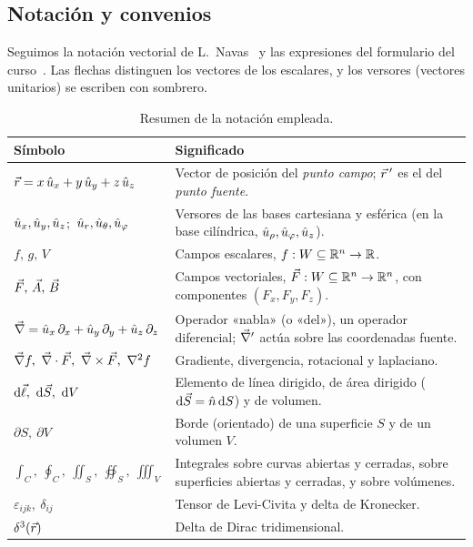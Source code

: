 \subsection{Notación y convenios}\label{sec:notacion}
Seguimos la notación vectorial de L.~Navas~\cite{NAVAS} y las expresiones del
formulario del curso~\cite{FORMULARIO}. Las flechas distinguen los
vectores de los escalares, y los versores (vectores unitarios) se escriben con
sombrero.

\begin{table}[ht]
\centering
\caption{Resumen de la notación empleada.}
\label{tab:notacion}
\small
\renewcommand{\arraystretch}{1.35}
\begin{tabular}{@{}p{4.6cm}p{9.2cm}@{}}
\toprule
Símbolo & Significado\\
\midrule
$\vec{r}=x\,\hat{u}_{x}+y\,\hat{u}_{y}+z\,\hat{u}_{z}$ & Vector de posición del \emph{punto campo};
  $\vec{r}\,'$ es el del \emph{punto fuente}.\\
$\hat{u}_{x},\hat{u}_{y},\hat{u}_{z}$;\ $\hat{u}_{r},\hat{u}_{\theta},\hat{u}_{\varphi}$ & Versores de las bases cartesiana y esférica
  (en la base cilíndrica, $\hat{u}_{\rho},\hat{u}_{\varphi},\hat{u}_{z}$).\\
$f,\,g,\,V$ & Campos escalares, $f:W\subseteq\mathbb{R}^{n}\to\mathbb{R}$.\\
$\vec{F},\,\vec{A},\,\vec{B}$ & Campos vectoriales, $\vec{F}:W\subseteq\mathbb{R}^{n}\to\mathbb{R}^{n}$,
  con componentes $(F_x,F_y,F_z)$.\\
$\vec{\nabla}=\hat{u}_{x}\,\partial_x+\hat{u}_{y}\,\partial_y+\hat{u}_{z}\,\partial_z$ & Operador «nabla»
  (o «del»), un operador diferencial; $\vec{\nabla}'$ actúa sobre las coordenadas fuente.\\
$\nab f,\ \nab\cdot\vc{F},\ \nab\times\vc{F},\ \Lap f$ & Gradiente, divergencia,
  rotacional y laplaciano.\\
$\dl,\ \dS,\ \dV$ & Elemento de línea dirigido, de área dirigido
  ($\mathrm{d}\vec{S}=\hat{n}\,\mathrm{d} S$) y de volumen.\\
$\partial S,\ \partial V$ & Borde (orientado) de una superficie $S$ y de un
  volumen $V$.\\
$\displaystyle\int_{C}\!,\ \oint_{C},\ \iint_{S},\ \oiint_{S},\ \iiint_{V}$ &
  Integrales sobre curvas abiertas y cerradas, sobre superficies abiertas y
  cerradas, y sobre volúmenes.\\
$\varepsilon_{ijk},\ \delta_{ij}$ & Tensor de Levi-Civita y delta de Kronecker.\\
$\delta^{3}(\vec{r})$ & Delta de Dirac tridimensional.\\
\bottomrule
\end{tabular}
\end{table}

